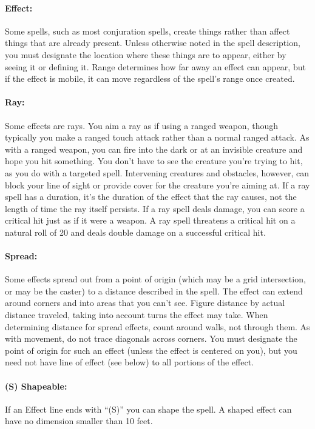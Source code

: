 \paragraph{Effect:} Some spells, such as most conjuration spells, create things rather than affect things that are already present. 
Unless otherwise noted in the spell description, you must designate the location where these things are to appear, 
either by seeing it or defining it. Range determines how far away an effect can appear, but if the effect is mobile, 
it can move regardless of the spell's range once created.

\paragraph{Ray:} Some effects are rays. You aim a ray as if using a ranged weapon, 
though typically you make a ranged touch attack rather than a normal ranged attack. 
As with a ranged weapon, you can fire into the dark or at an invisible creature and hope you hit something. 
You don't have to see the creature you're trying to hit, as you do with a targeted spell. 
Intervening creatures and obstacles, however, can block your line of sight or provide cover for the creature you're aiming at.
If a ray spell has a duration, it's the duration of the effect that the ray causes, not the length of time the ray itself persists.
If a ray spell deals damage, you can score a critical hit just as if it were a weapon. 
A ray spell threatens a critical hit on a natural roll of 20 and deals double damage on a successful critical hit.

\paragraph{Spread:} Some effects spread out from a point of origin (which may be a grid intersection, or may be the caster) 
to a distance described in the spell. The effect can extend around corners and into areas that you can't see. 
Figure distance by actual distance traveled, taking into account turns the effect may take. 
When determining distance for spread effects, count around walls, not through them. 
As with movement, do not trace diagonals across corners. 
You must designate the point of origin for such an effect (unless the effect is centered on you), 
but you need not have line of effect (see below) to all portions of the effect.

\paragraph{(S) Shapeable:} If an Effect line ends with “(S)” you can shape the spell. 
A shaped effect can have no dimension smaller than 10 feet.

